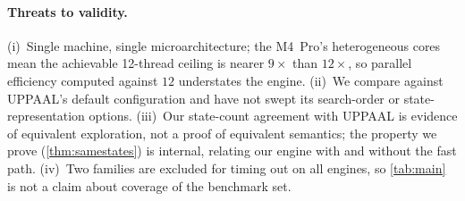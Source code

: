 \paragraph{Threats to validity.}  (i)~Single machine, single microarchitecture;
the M4~Pro's heterogeneous cores mean the achievable 12-thread ceiling is nearer
$9\times$ than $12\times$, so parallel efficiency computed against $12$
understates the engine.  (ii)~We compare against UPPAAL's default configuration
and have not swept its search-order or state-representation options.  (iii)~Our
state-count agreement with UPPAAL is evidence of equivalent exploration, not a
proof of equivalent semantics; the property we prove (\cref{thm:samestates}) is
internal, relating our engine with and without the fast path.  (iv)~Two families
are excluded for timing out on all engines, so \cref{tab:main} is not a claim
about coverage of the benchmark set.

